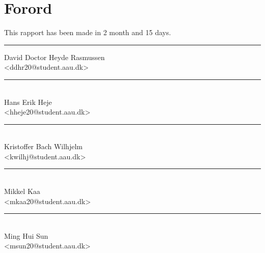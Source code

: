 \section*{Forord}%

This rapport has been made in 2 month and 15 days.

\vfill\noindent

\begin{center}
\begin{minipage}[b]{0.45\textwidth}
 \centering
 \rule{\textwidth}{0.5pt}
  David Doctor Heyde Rasmussen\\
 {\footnotesize <ddhr20@student.aau.dk>}
\end{minipage}
\end{center}

\begin{center}
\begin{minipage}[b]{0.45\textwidth}
 \centering
 \rule{\textwidth}{0.5pt}\\
  Hans Erik Heje\\
 {\footnotesize <hheje20@student.aau.dk>}
\end{minipage}
\hfill
\begin{minipage}[b]{0.45\textwidth}
 \centering
 \rule{\textwidth}{0.5pt}\\
  Kristoffer Bach Wilhjelm\\
 {\footnotesize <kwilhj@student.aau.dk>}
\end{minipage}
\vspace{3\baselineskip}
\end{center}

\begin{center}
\begin{minipage}[b]{0.45\textwidth}
 \centering
 \rule{\textwidth}{0.5pt}\\
  Mikkel Kaa\\
 {\footnotesize <mkaa20@student.aau.dk>}
\end{minipage}
\hfill
\begin{minipage}[b]{0.45\textwidth}
 \centering
 \rule{\textwidth}{0.5pt}\\
  Ming Hui Sun\\
 {\footnotesize <msun20@student.aau.dk>}
\end{minipage}
\end{center}

